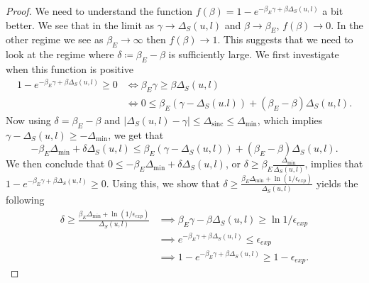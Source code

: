 \documentclass{article}
\DeclareMathOperator{\sinc}{sinc}
\begin{document}
\begin{proof}
    We need to understand the function $f(\beta) = 1 - e^{-\beta_E \gamma + \beta \Delta_S(u,l)}$ a bit better. We see that in the limit as $\gamma \to \Delta_S(u,l)$ and $\beta \to \beta_E$, $f(\beta) \to 0$. In the other regime we see as $\beta_E \to \infty$ then $f(\beta) \to 1$. This suggests that we need to look at the regime where $\delta \coloneqq \beta_E - \beta$ is sufficiently large. We first investigate when this function is positive
    \begin{align}
        1 - e^{-\beta_E \gamma + \beta \Delta_S(u,l)} \geq 0 &\iff \beta_E \gamma \geq \beta \Delta_S(u,l) \\
        &\iff 0 \leq \beta_E (\gamma - \Delta_S(u.l)) + (\beta_E - \beta) \Delta_S(u,l).
    \end{align}
    Now using $\delta = \beta_E - \beta$ and $|\Delta_S(u,l) - \gamma| \leq \Delta_{\sinc} \leq \Delta_{\min}$, which implies $\gamma - \Delta_S(u,l) \geq - \Delta_{\min}$, we get that 
    \begin{equation}
        -\beta_E \Delta_{\min} + \delta \Delta_S(u,l) \leq \beta_E (\gamma - \Delta_S(u,l)) + (\beta_E - \beta) \Delta_S(u,l).
    \end{equation}
    We then conclude that $0 \leq -\beta_E \Delta_{\min} + \delta \Delta_S(u,l)$, or $\delta \geq \beta_E \frac{\Delta_{\min}}{\Delta_S(u,l)}$, implies that $1 - e^{-\beta_E \gamma + \beta \Delta_S(u,l)} \geq 0$. Using this, we show that $\delta \geq \frac{\beta_E \Delta_{\min} + \ln(1/\epsilon_{exp})}{\Delta_S(u,l)}$ yields the following
    \begin{align}
        \delta \geq \frac{\beta_E \Delta_{\min} + \ln(1/\epsilon_{exp})}{\Delta_S(u,l)} &\implies \beta_E \gamma - \beta \Delta_S(u,l) \geq \ln 1/ \epsilon_{exp} \\
        &\implies e^{-\beta_E \gamma + \beta \Delta_S(u,l)} \leq \epsilon_{exp} \\
        &\implies 1 - e^{-\beta_E \gamma + \beta \Delta_S(u,l)} \geq 1 - \epsilon_{exp}.
    \end{align}


\end{proof}
\end{document}
